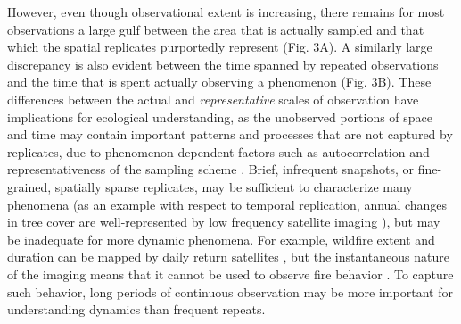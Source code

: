 \documentclass[12pt]{article}
\begin{document}
However, even though observational extent is increasing, there remains for most observations a large gulf between the area that is actually sampled and that which the spatial replicates purportedly represent (Fig. 3A). A similarly large discrepancy is also evident between the time spanned by repeated observations and the time that is spent actually observing a phenomenon (Fig. 3B). These differences between the actual and \emph{representative} scales of observation have implications for ecological understanding, as the unobserved portions of space and time may contain important patterns and processes that are not captured by replicates, due to phenomenon-dependent factors such as autocorrelation and representativeness of the sampling scheme \cite{underwood_experiments_1997,palmer_scale_1994, cao_comparison_2002, legendre_spatial_1993,collins_method_2000}. Brief, infrequent snapshots, or fine-grained, spatially sparse replicates, may be sufficient to characterize many phenomena (as an example with respect to temporal replication, annual changes in tree cover are well-represented by low frequency satellite imaging \cite{hansen_high-resolution_2013}), but may be inadequate for more dynamic phenomena. For example, wildfire extent and duration can be mapped by daily return satellites \cite{roy_prototyping_2005,jones_fire_2009}, but the instantaneous nature of the imaging means that it cannot be used to observe fire behavior \cite{clements_observing_2007}. To capture such behavior, long periods of continuous observation may be more important for understanding dynamics than frequent repeats. 
\end{document}
